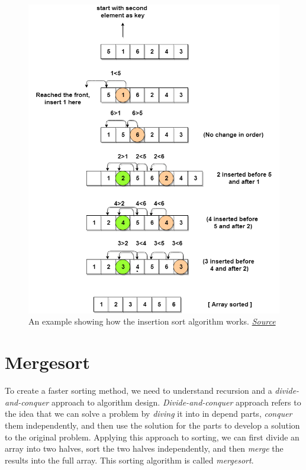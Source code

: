 \begin{figure}
    \centering
    \includegraphics[width=\textwidth]{images/insertion-sort.png}
    \caption{An example showing how the insertion sort algorithm works. \href{https://vivaharsha.com/product/verilog-implementation-of-insertion-sort-16-bits-and-5-inputs/}{\textit{Source}}}
    \label{fig:insertion_sort}
\end{figure}


\section{Mergesort}
To create a faster sorting method, we need to understand recursion and a \textit{divide-and-conquer} approach to algorithm design. \textit{Divide-and-conquer} approach refers to the idea that we can solve a problem by \textit{diving} it into in depend parts, \textit{conquer} them independently, and then use the solution for the parts to develop a solution to the original problem. Applying this approach to sorting, we can first divide an array into two halves, sort the two halves independently, and then \textit{merge} the results into the full array. This sorting algorithm is called \textit{mergesort}. 

